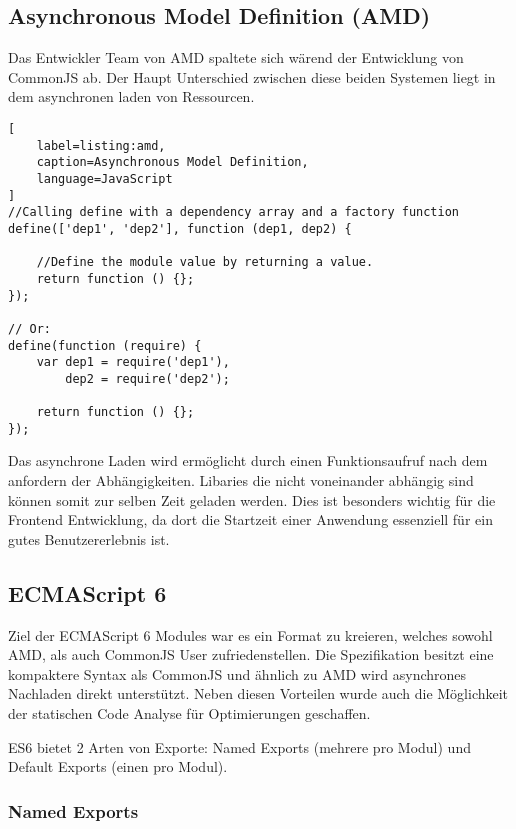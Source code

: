 \subsection{Asynchronous Model Definition (AMD)}

Das Entwickler Team von AMD spaltete sich wärend der Entwicklung von CommonJS ab. Der Haupt Unterschied zwischen diese beiden Systemen liegt in dem asynchronen laden von Ressourcen. \autocite{SebastianPeyrott}

\begin{lstlisting}[
    label=listing:amd,
	caption=Asynchronous Model Definition,
	language=JavaScript
]
//Calling define with a dependency array and a factory function
define(['dep1', 'dep2'], function (dep1, dep2) {

    //Define the module value by returning a value.
    return function () {};
});

// Or:
define(function (require) {
    var dep1 = require('dep1'),
        dep2 = require('dep2');

    return function () {};
});
\end{lstlisting}

Das asynchrone Laden wird ermöglicht durch einen Funktionsaufruf nach dem anfordern der  Abhängigkeiten. Libaries die nicht voneinander abhängig sind können somit zur selben Zeit geladen werden. Dies ist besonders wichtig für die Frontend Entwicklung, da dort die Startzeit einer Anwendung essenziell für ein gutes Benutzererlebnis ist. \autocite{SebastianPeyrott}

\subsection{ECMAScript 6}
Ziel der ECMAScript 6 Modules war es ein Format zu kreieren, welches sowohl AMD, als auch CommonJS User zufriedenstellen. Die Spezifikation besitzt eine kompaktere Syntax als CommonJS und ähnlich zu AMD wird asynchrones Nachladen direkt unterstützt. Neben diesen Vorteilen wurde auch die Möglichkeit der statischen Code Analyse für Optimierungen geschaffen. 

ES6 bietet 2 Arten von Exporte: Named Exports (mehrere pro Modul) und Default Exports (einen pro Modul). \autocite{AxelRauschmayer}

\subsubsection{Named Exports}
\label{subsubsection:named_exports}

